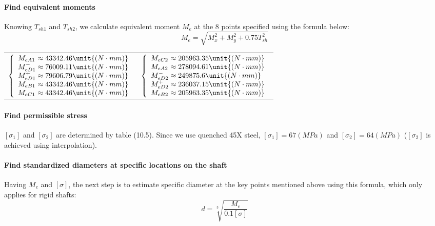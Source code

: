 \paragraph{Find equivalent moments} Knowing $ T_{sh1} $ and $ T_{sh2} $, we calculate equivalent moment $ M_e $ at the 8 points specified using the formula below:
\[M_e = \sqrt{M_x^2 + M_y^2 + 0.75T_{sh}^2}\]

	\begin{tabular}{p{7cm}p{7cm}}
		$
		\left\{ 
		\begin{array}{l@{{} \approx {}}l}
		M_{eA1} & 43342.46 \unit{(N\cdot mm)}\\
		M_{eD1}^- & 76009.11 \unit{(N\cdot mm)}\\
		M_{eD1}^+ & 79606.79 \unit{(N\cdot mm)}\\
		M_{eB1} & 43342.46 \unit{(N\cdot mm)}\\
		M_{eC1} & 43342.46 \unit{(N\cdot mm)}\\
		\end{array}
		\right.
		$ &
		$
		\left\{ 
		\begin{array}{l@{{} \approx {}}l}
		M_{eC2} & 205963.35 \unit{(N\cdot mm)}\\
		M_{eA2} & 278094.61 \unit{(N\cdot mm)}\\
		M_{eD2}^- & 249875.6 \unit{(N\cdot mm)}\\
		M_{eD2}^+ & 236037.15 \unit{(N\cdot mm)}\\
		M_{eB2} & 205963.35 \unit{(N\cdot mm)}\\
		\end{array}
		\right.
		$
	\end{tabular}\vskip2mm

\paragraph{Find permissible stress}
$ [\sigma_1] $ and $ [\sigma_2] $ are determined by table (10.5). Since we use quenched 45X steel, $ [\sigma_1] = 67 \unit{(MPa)}$ and $ [\sigma_2] = 64 \unit{(MPa)}$ ($ [\sigma_2] $ is achieved using interpolation).

\paragraph{Find standardized diameters at specific locations on the shaft} Having $ M_e $ and $ [\sigma] $, the next step is to estimate specific diameter at the key points mentioned above using this formula, which only applies for rigid shafts:
\[d = \sqrt[3]{\dfrac{M_e}{0.1[\sigma]}}\]


